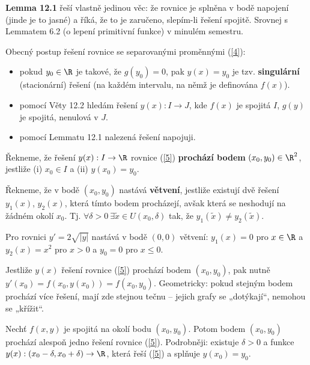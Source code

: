 \begin{poznamka}
\textbf{Lemma 12.1} řeší vlastně jedinou věc: že rovnice je splněna v bodě napojení (jinde je to jasné) a říká, že to je zaručeno, slepím-li řešení spojitě. Srovnej s Lemmatem 6.2 (o lepení primitivní funkce) v minulém semestru.
\end{poznamka}

\begin{poznamka}
Obecný postup řešení rovnice se separovanými proměnnými (\ref{4}):
\begin{itemize}
    \item pokud $y_0 \in \R$ je takové, že $g(y_0) = 0$, pak $y(x) = y_0$ je tzv. \textbf{singulární} (stacionární) řešení (na každém intervalu, na němž je definována $f(x)$).
    \item pomocí Věty 12.2 hledám řešení $y(x): I \to J$, kde $f(x)$ je spojitá $I$, $g(y)$ je spojitá, nenulová v $J$.
    \item pomocí Lemmatu 12.1 nalezená řešení napojuji.
\end{itemize}
\end{poznamka}

\begin{definice}
Řekneme, že řešení $y(x): I \to \R$ rovnice (\ref{5}) \textbf{prochází bodem} $(x_0, y_0) \in \R^2$, jestliže (i) $x_0 \in I$ a (ii) $y(x_0) = y_0$.

Řekneme, že v bodě $(x_0, y_0)$ nastává \textbf{větvení}, jestliže existují dvě řešení $y_1(x)$, $y_2(x)$, která tímto bodem procházejí, avšak která se neshodují na žádném okolí $x_0$. Tj. $\forall \delta > 0 \ \exists \tilde{x} \in U(x_0, \delta)$ tak, že $y_1(\tilde{x}) \neq y_2(\tilde{x})$.
\end{definice}

\begin{priklad}
Pro rovnici $y' = 2\sqrt{|y|}$ nastává v bodě $(0,0)$ větvení: $y_1(x) = 0$ pro $x \in \R$ a $y_2(x) = x^2$ pro $x > 0$ a $y_0 = 0$ pro $x \leq 0$.
\end{priklad}

\begin{poznamka}
Jestliže $y(x)$ řešení rovnice (\ref{5}) prochází bodem $(x_0, y_0)$, pak nutně $y'(x_0) = f(x_0, y(x_0)) = f(x_0, y_0)$. Geometricky: pokud stejným bodem prochází více řešení, mají zde stejnou tečnu – jejich grafy se „dotýkají“, nemohou se „křížit“.
\end{poznamka}

\begin{veta}[Peano]
Nechť $f(x, y)$ je spojitá na okolí bodu $(x_0, y_0)$. Potom bodem $(x_0, y_0)$ prochází alespoň jedno řešení rovnice (\ref{5}). Podrobněji: existuje $\delta > 0$ a funkce $y(x): (x_0 - \delta, x_0 + \delta) \to \R$, která řeší (\ref{5}) a splňuje $y(x_0) = y_0$.
\end{veta}

